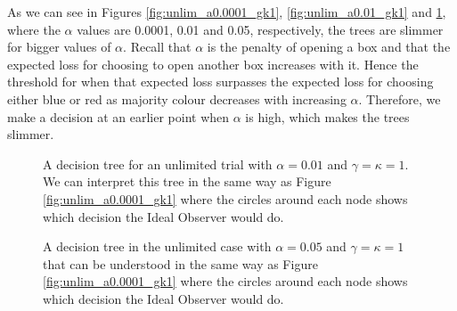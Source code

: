 As we can see in Figures \ref{fig:unlim_a0.0001_gk1}, \ref{fig:unlim_a0.01_gk1} and \ref{fig:unlim_a0.05_gk1}, where the $\alpha$ values are 0.0001, 0.01 and 0.05, respectively, the trees are slimmer for bigger values of $\alpha$. Recall that $\alpha$ is the penalty of opening a box and that the expected loss for choosing to open another box increases with it. Hence the threshold for when that expected loss surpasses the expected loss for choosing either blue or red as majority colour decreases with increasing $\alpha$. Therefore, we make a decision at an earlier point when $\alpha$ is high, which makes the trees slimmer.
\begin{figure}
    \centering
    \begin{minipage}{0.45\textwidth} 
        \centering
        \scalebox{0.5}{}
        \caption[IO solution, unlimited. $\alpha=0.01$,$\gamma=\kappa=1$]{A decision tree for an unlimited trial with $\alpha = 0.01$ and $\gamma=\kappa=1$.
        We can interpret this tree in the same way as Figure \ref{fig:unlim_a0.0001_gk1} where the circles around each node shows which decision the Ideal Observer would do.}
        \label{fig:unlim_a0.01_gk1}
    \end{minipage}\hfill
    \begin{minipage}{0.45\textwidth}
        \centering
        \scalebox{0.5}{}
        \caption[IO solution, unlimited. $\alpha=0.05$,$\gamma=\kappa=1$]{A decision tree in the unlimited case with $\alpha = 0.05$ and $\gamma=\kappa=1$ that can be understood in the same way as Figure \ref{fig:unlim_a0.0001_gk1} where the circles around each node shows which decision the Ideal Observer would do.}
        \label{fig:unlim_a0.05_gk1}
    \end{minipage}
\end{figure}



